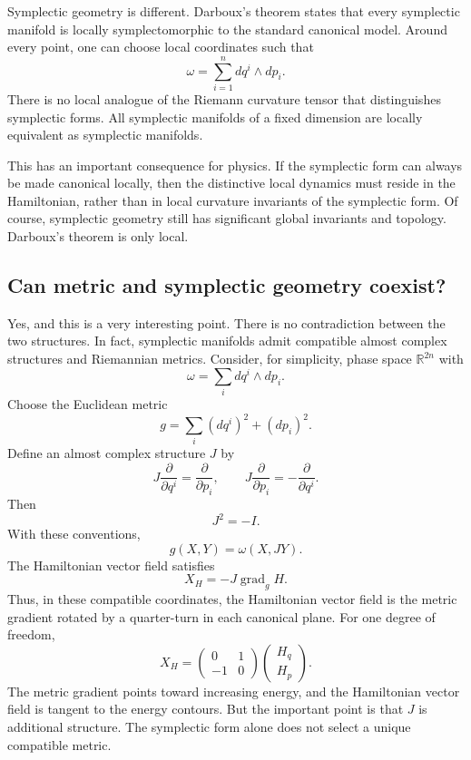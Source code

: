Symplectic geometry is different.
Darboux's theorem states that every symplectic manifold is locally
symplectomorphic to the standard canonical model.
Around every point, one can choose local coordinates such that
\[
\boxed{
\omega=\sum_{i=1}^n dq^i\wedge dp_i.
}
\]
There is no local analogue of the Riemann curvature tensor that distinguishes
symplectic forms.
All symplectic manifolds of a fixed dimension are locally equivalent as
symplectic manifolds.

This has an important consequence for physics. If the symplectic form can
always be made canonical locally, then the distinctive local dynamics must
reside in the Hamiltonian, rather than in local curvature invariants of the
symplectic form. Of course, symplectic geometry still has significant global
invariants and topology. Darboux's theorem is only local. 

\subsection{ Can metric and symplectic geometry coexist?}
Yes, and this is a very interesting point.
There is no contradiction between the two structures.
In fact, symplectic manifolds admit compatible almost complex structures and
Riemannian metrics.
Consider, for simplicity, phase space \(\mathbb R^{2n}\) with
\[
\omega=\sum_i dq^i\wedge dp_i.
\]
Choose the Euclidean metric
\[
g=\sum_i(dq^i)^2+(dp_i)^2.
\]
Define an almost complex structure \(J\) by
\[
J\frac{\partial}{\partial q^i}
=\frac{\partial}{\partial p_i},
\qquad
J\frac{\partial}{\partial p_i}
=-\frac{\partial}{\partial q^i}.
\]
Then
\[
J^2=-I.
\]
With these conventions,
\[
\boxed{g(X,Y)=\omega(X,JY).}
\]
The Hamiltonian vector field satisfies
\[
\boxed{
X_H=-J\operatorname{grad}_gH.
}
\]
Thus, in these compatible coordinates, the Hamiltonian vector field is the
metric gradient rotated by a quarter-turn in each canonical plane.
For one degree of freedom,
\[
X_H=
\begin{pmatrix}
0&1\\
-1&0
\end{pmatrix}
\begin{pmatrix}
H_q\\
H_p
\end{pmatrix}.
\]
The metric gradient points toward increasing energy, and the Hamiltonian vector
field is tangent to the energy contours.
But the important point is that \(J\) is additional structure. The symplectic
form alone does not select a unique compatible metric.

